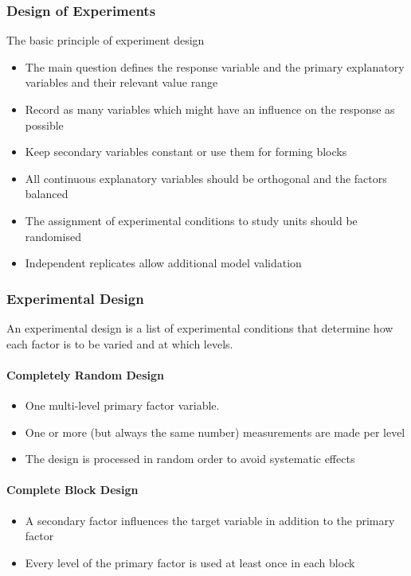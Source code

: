\documentclass[11pt]{article}
\theoremstyle{definition}
\begin{document}
\subsubsection{Design of Experiments}
The basic principle of experiment design
\begin{itemize}
	\item The main question defines the response variable and the primary explanatory variables and their relevant value range
	\item Record as many variables which might have an influence on the response as possible
	\item Keep secondary variables constant or use them for forming blocks
	\item All continuous explanatory variables should be orthogonal and the factors balanced
	\item The assignment of experimental conditions to study units should be randomised
	\item Independent replicates allow additional model validation
\end{itemize}

\subsubsection{Experimental Design}
An experimental design is a list of experimental conditions that determine how each factor is to be varied and at which levels.

\paragraph{Completely Random Design}
\begin{itemize}[nosep]
	\item One multi-level primary factor variable.
	\item One or more (but always the same number) measurements are made per level
	\item The design is processed in random order to avoid systematic effects
\end{itemize}

\paragraph{Complete Block Design}
\begin{itemize}[nosep]
	\item A secondary factor influences the target variable in addition to the primary factor
	\item Every level of the primary factor is used at least once in each block
\end{itemize}
\end{document}
